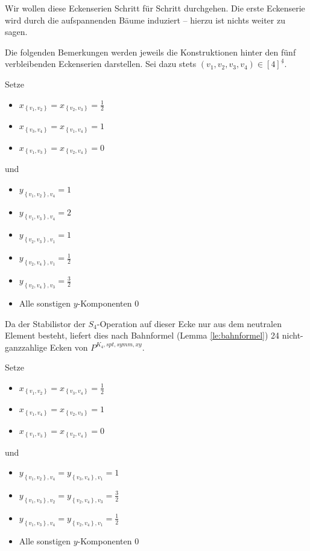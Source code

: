 \documentclass[10p,a4paper,BCOR = 12mm, DIV=15]{scrbook}
\begin{document}
{Wir wollen diese Eckenserien Schritt für Schritt durchgehen. Die erste Eckenserie wird durch die aufspannenden Bäume induziert -- hierzu ist nichts weiter zu sagen.

Die folgenden Bemerkungen werden jeweils die Konstruktionen hinter den fünf verbleibenden Eckenserien darstellen. Sei dazu stets $\left(v_1, v_2, v_3, v_4\right) \in \left[4\right]^{\underline{4}}$.

\begin{Bem}
Setze
\begin{itemize}
\item $x_{\left\{v_1, v_2\right\}} = x_{\left\{v_2, v_3\right\}} = \frac{1}{2}$
\item $x_{\left\{v_3, v_4\right\}} = x_{\left\{v_1, v_4\right\}} = 1$
\item $x_{\left\{v_1, v_3\right\}} = x_{\left\{v_2, v_4\right\}} = 0$
\end{itemize}
und
\begin{itemize}
\item $y_{\left\{v_1, v_2\right\}, v_4} = 1$
\item $y_{\left\{v_1, v_3\right\}, v_4} = 2$
\item $y_{\left\{v_2, v_3\right\}, v_1} = 1$
\item $y_{\left\{v_2, v_4\right\}, v_1} = \frac{1}{2}$
\item $y_{\left\{v_2, v_4\right\}, v_3} = \frac{3}{2}$
\item Alle sonstigen $y$-Komponenten $0$
\end{itemize}

Da der Stabilistor der $S_4$-Operation auf dieser Ecke nur aus dem neutralen Element besteht, liefert dies nach Bahnformel (Lemma \ref{le:bahnformel}) 24 nicht-ganzzahlige Ecken von $P^{K_4, spt, symm, xy}$.
\end{Bem}

\begin{Bem}
Setze
\begin{itemize}
\item $x_{\left\{v_1, v_2\right\}} = x_{\left\{v_3, v_4\right\}} = \frac{1}{2}$
\item $x_{\left\{v_1, v_4\right\}} = x_{\left\{v_2, v_3\right\}} = 1$
\item $x_{\left\{v_1, v_3\right\}} = x_{\left\{v_2, v_4\right\}} = 0$
\end{itemize}
und
\begin{itemize}
\item $y_{\left\{v_1, v_2\right\}, v_4} = y_{\left\{v_3, v_4\right\}, v_1} = 1$
\item $y_{\left\{v_1, v_3\right\}, v_2} = y_{\left\{v_2, v_4\right\}, v_3} = \frac{3}{2}$
\item $y_{\left\{v_1, v_3\right\}, v_4} = y_{\left\{v_2, v_4\right\}, v_1} = \frac{1}{2}$
\item Alle sonstigen $y$-Komponenten $0$
\end{itemize}


\end{Bem}}
\end{document}
